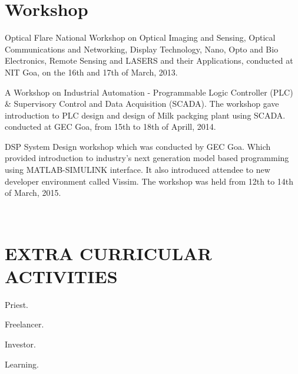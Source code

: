 \documentclass[fontsize=11pt]{tccv}
\begin{document}
\section{Workshop}
\begin{skills}
\item {Optical Flare National Workshop on Optical Imaging and Sensing, Optical Communications and Networking, Display Technology, Nano, Opto and Bio Electronics, Remote Sensing and LASERS and their Applications, conducted at NIT Goa, on the 16th and 17th of March, 2013. }
\item {A Workshop on Industrial Automation - Programmable Logic Controller (PLC) \& Supervisory Control and Data Acquisition (SCADA). The workshop gave introduction to PLC design and design of Milk packging plant using  SCADA.  conducted at GEC Goa, from  15th to 18th of Aprill, 2014. }
\item {DSP System Design workshop which was conducted by GEC Goa. Which provided introduction to industry’s next generation model based programming using MATLAB-SIMULINK interface. It also introduced attendee to new developer environment called Vissim. The workshop was  held from 12th to 14th of March, 2015. }
\end{skills}\\
\vspace{8em}


\section{EXTRA CURRICULAR ACTIVITIES}
\begin{skills}
\item {Priest.}
\item{Freelancer.}
\item{Investor.}
\item{Learning.}
\end{skills}
\vspace{1em}
\end{document}
